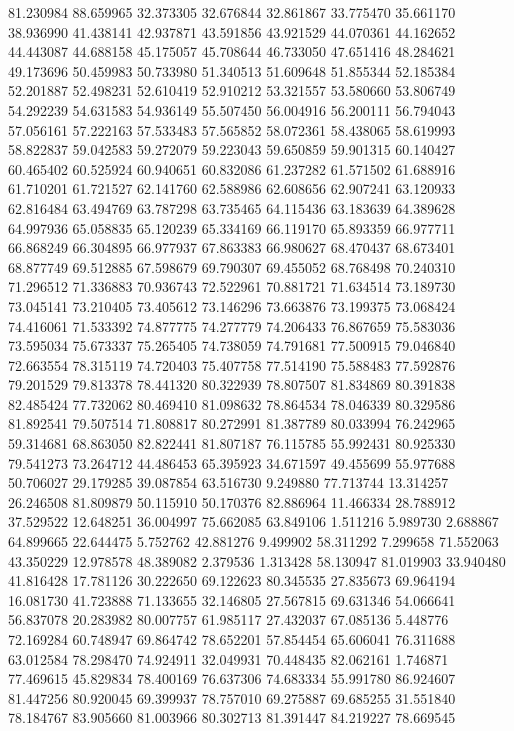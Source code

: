 81.230984
88.659965
32.373305
32.676844
32.861867
33.775470
35.661170
38.936990
41.438141
42.937871
43.591856
43.921529
44.070361
44.162652
44.443087
44.688158
45.175057
45.708644
46.733050
47.651416
48.284621
49.173696
50.459983
50.733980
51.340513
51.609648
51.855344
52.185384
52.201887
52.498231
52.610419
52.910212
53.321557
53.580660
53.806749
54.292239
54.631583
54.936149
55.507450
56.004916
56.200111
56.794043
57.056161
57.222163
57.533483
57.565852
58.072361
58.438065
58.619993
58.822837
59.042583
59.272079
59.223043
59.650859
59.901315
60.140427
60.465402
60.525924
60.940651
60.832086
61.237282
61.571502
61.688916
61.710201
61.721527
62.141760
62.588986
62.608656
62.907241
63.120933
62.816484
63.494769
63.787298
63.735465
64.115436
63.183639
64.389628
64.997936
65.058835
65.120239
65.334169
66.119170
65.893359
66.977711
66.868249
66.304895
66.977937
67.863383
66.980627
68.470437
68.673401
68.877749
69.512885
67.598679
69.790307
69.455052
68.768498
70.240310
71.296512
71.336883
70.936743
72.522961
70.881721
71.634514
73.189730
73.045141
73.210405
73.405612
73.146296
73.663876
73.199375
73.068424
74.416061
71.533392
74.877775
74.277779
74.206433
76.867659
75.583036
73.595034
75.673337
75.265405
74.738059
74.791681
77.500915
79.046840
72.663554
78.315119
74.720403
75.407758
77.514190
75.588483
77.592876
79.201529
79.813378
78.441320
80.322939
78.807507
81.834869
80.391838
82.485424
77.732062
80.469410
81.098632
78.864534
78.046339
80.329586
81.892541
79.507514
71.808817
80.272991
81.387789
80.033994
76.242965
59.314681
68.863050
82.822441
81.807187
76.115785
55.992431
80.925330
79.541273
73.264712
44.486453
65.395923
34.671597
49.455699
55.977688
50.706027
29.179285
39.087854
63.516730
9.249880
77.713744
13.314257
26.246508
81.809879
50.115910
50.170376
82.886964
11.466334
28.788912
37.529522
12.648251
36.004997
75.662085
63.849106
1.511216
5.989730
2.688867
64.899665
22.644475
5.752762
42.881276
9.499902
58.311292
7.299658
71.552063
43.350229
12.978578
48.389082
2.379536
1.313428
58.130947
81.019903
33.940480
41.816428
17.781126
30.222650
69.122623
80.345535
27.835673
69.964194
16.081730
41.723888
71.133655
32.146805
27.567815
69.631346
54.066641
56.837078
20.283982
80.007757
61.985117
27.432037
67.085136
5.448776
72.169284
60.748947
69.864742
78.652201
57.854454
65.606041
76.311688
63.012584
78.298470
74.924911
32.049931
70.448435
82.062161
1.746871
77.469615
45.829834
78.400169
76.637306
74.683334
55.991780
86.924607
81.447256
80.920045
69.399937
78.757010
69.275887
69.685255
31.551840
78.184767
83.905660
81.003966
80.302713
81.391447
84.219227
78.669545
